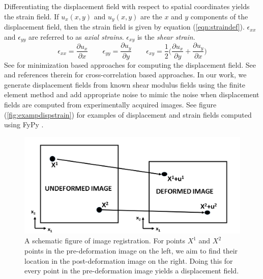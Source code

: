 \documentclass[10pt]{article}
\newcommand{\beq}{\begin{equation}}
\newcommand{\eeq}{\end{equation}}
\newcommand{\pdd}[2]{\frac{\partial{{#1}}}{\partial{#2}}}
\begin{document}
Differentiating the displacement field with respect to spatial coordinates yields the strain field. If $u_x(x,y)$ and $u_{y}(x,y)$ are the $x$ and $y$ components of the displacement field, then the strain field is given by equation (\ref{eqn:straindef}). $\epsilon_{xx}$ and $\epsilon_{yy}$ are referred to as \textit{axial strains}. $\epsilon_{xy}$ is the \textit{shear strain}.
\beq
\label{eqn:straindef}
\epsilon_{xx} = \pdd{u_{x}}{x} \qquad \epsilon_{yy} = \pdd{u_{y}}{y} \qquad \epsilon_{xy} = \frac{1}{2}\Big(\pdd{u_{x}}{y} + \pdd{u_{y}}{x}\Big)
\eeq
See \cite{paper:richards2009,paper:gokhale2004,paper:pellot-barakat2004} for minimization based approaches for computing the displacement field. See \cite{paper:ophir1991,paper:ophir1996,paper:alam1998} and references therein for cross-correlation based approaches. In our work, we generate displacement fields from known shear modulus fields using the finite element method \cite{book:hugheslinear,book:fishbelytschko} and add appropriate noise to mimic the noise when displacement fields are computed from experimentally acquired images. See figure (\ref{fig:exampdispstrain}) for examples of displacement and strain fields computed using FyPy \cite{misc:fypy}.
%
\begin{figure}[!h]
  \centering
  \includegraphics[totalheight=4cm]{Figures/registnew.png}
  \caption{\label{fig:registschematic} A schematic figure of image registration. For points $X^1$ and $X^2$ points in the pre-deformation image on the left, we aim to find their location in the post-deformation image on the right. Doing this for every point in the pre-deformation image yields a displacement field.}
\end{figure}
%
\end{document}
